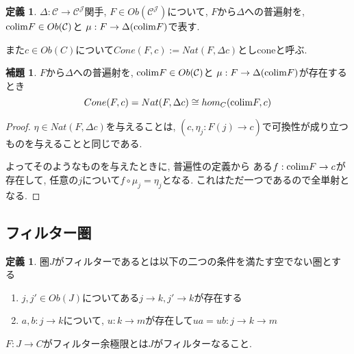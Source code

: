 \documentclass[dvipdfmx,a4paper,11pt]{article}
\newcommand{\colim}{{\rm colim}}
\theoremstyle{definition}
\newtheorem{lem}[thm]{補題}
\newtheorem{dfn}[thm]{定義}
\begin{document}
 \begin{tcolorbox}
 [colback = white, colframe = green!35!black, fonttitle = \bfseries,breakable = true]
\begin{dfn}
$\Delta : \mathcal{C} \to \mathcal{C}^{\mathcal{J}}$関手, 
$F \in Ob(\mathcal{C}^{\mathcal{J}})$について, 
$F$から$\Delta $への普遍射を, 
$\colim F \in Ob(\mathcal{C})$と $\mu: F \to \Delta (\colim F)$で表す.

また$c \in Ob(C)$について$Cone(F,c):= Nat(F,\Delta c)$としconeと呼ぶ.
\end{dfn}
\end{tcolorbox}


 \begin{tcolorbox}
 [colback = white, colframe = green!35!black, fonttitle = \bfseries,breakable = true]
\begin{lem}
$F$から$\Delta $への普遍射を, 
$\colim F \in Ob(\mathcal{C})$と $\mu: F \to \Delta (\colim F)$が存在するとき
$$
Cone(F,c) = Nat(F,\Delta c) \cong hom_{C}( \colim F , c)
$$
\end{lem}
\end{tcolorbox}
\begin{proof}
$\eta \in  Nat(F,\Delta c)$を与えることは, 
$(c, \eta_j : F(j) \to c)$で可換性が成り立つものを与えることと同じである.  

よってそのようなものを与えたときに, 普遍性の定義から
ある$ f:  \colim F \to c$が存在して, 任意の$j$について$f  \circ \mu_j = \eta_j$となる.
 これはただ一つであるので全単射となる. 
\end{proof}

\subsection{フィルター圏}

 \begin{tcolorbox}
 [colback = white, colframe = green!35!black, fonttitle = \bfseries,breakable = true]
\begin{dfn}
圏$J$がフィルターであるとは以下の二つの条件を満たす空でない圏とする
\begin{enumerate}
\item $j, j' \in Ob(J)$についてある$j \to k, j' \to k$が存在する
\item $a, b: j \to k$について, $u: k \to m$が存在して$ua = ub : j \to k \to m$
\end{enumerate}

$F : J \to C$がフィルター余極限とは$J$がフィルターなること.
\end{dfn}
\end{tcolorbox}
\end{document}
